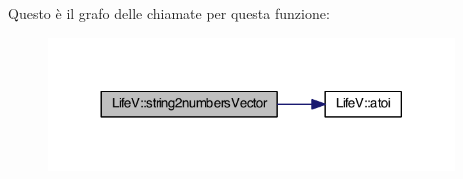 Questo è il grafo delle chiamate per questa funzione\-:\nopagebreak
\begin{figure}[H]
\begin{center}
\leavevmode
\includegraphics[width=305pt]{namespaceLifeV_a5f2c3319750ceebbeb2a3bb374a2596b_cgraph}
\end{center}
\end{figure}


